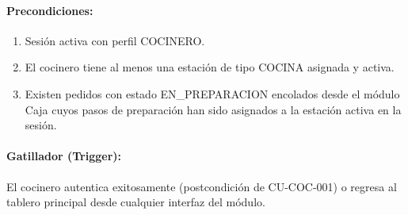 \paragraph{Precondiciones:}
\begin{enumerate}
    \item[I.] Sesión activa con perfil COCINERO.
    \item[II.] El cocinero tiene al menos una estación de tipo COCINA asignada y activa.
    \item[III.] Existen pedidos con estado EN\_PREPARACION encolados desde el módulo Caja cuyos pasos de preparación han sido asignados a la estación activa en la sesión.
\end{enumerate}

\paragraph{Gatillador (Trigger):} El cocinero autentica exitosamente (postcondición de CU-COC-001) o regresa al tablero principal desde cualquier interfaz del módulo.

